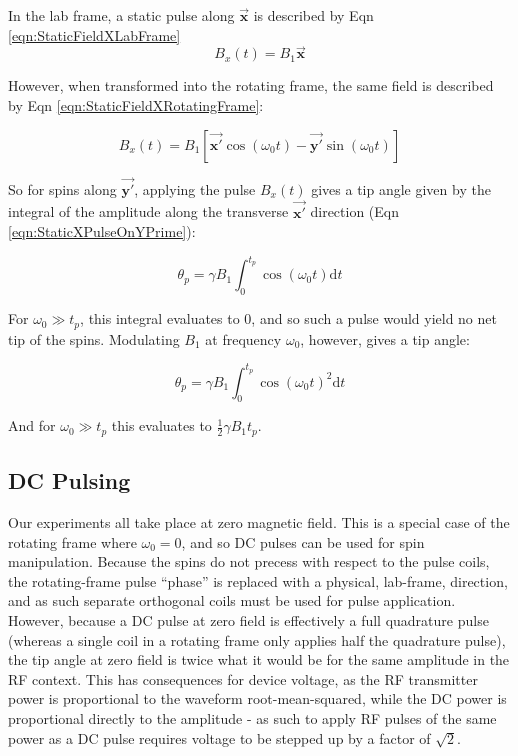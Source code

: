 \documentclass[PaulGanssle-Thesis.tex]{subfiles}
\begin{document}
In the lab frame, a static pulse along $\vec{\mathbf{x}}$ is described by Eqn \ref{eqn:StaticFieldXLabFrame}
\begin{equation}
\label{eqn:StaticFieldXLabFrame}
B_x(t) = B_{1}\vec{\mathbf{x}}
\end{equation}

However, when transformed into the rotating frame, the same field is described by Eqn \ref{eqn:StaticFieldXRotatingFrame}:

\begin{equation}
\label{eqn:StaticFieldXRotatingFrame}
B_x(t) = B_{1}\left[\vec{\mathbf{x'}}\cos\left(\omega_0 t\right) - \vec{\mathbf{y'}}\sin\left(\omega_0 t\right)\right]
\end{equation}

So for spins along $\vec{\mathbf{y'}}$, applying the pulse $B_x(t)$ gives a tip angle given by the integral of the amplitude along the transverse $\vec{\mathbf{x'}}$ direction (Eqn \ref{eqn:StaticXPulseOnYPrime}):

\begin{equation}
\label{eqn:StaticXPulseOnYPrime}
\theta_p = \gamma B_{1}\int_0^{t_p}\!\cos\left(\omega_0 t\right)\mathrm{d}t
\end{equation}

For $\omega_0 \gg t_p$, this integral evaluates to 0, and so such a pulse would yield no net tip of the spins. Modulating $B_1$ at frequency $\omega_0$, however, gives a tip angle:

\begin{equation}
\label{eqn:ResonantPulseXPrime}
\theta_p = \gamma B_{1} \int_0^{t_p}\!\cos\left(\omega_0 t\right)^2\mathrm{d}t
\end{equation}

And for $\omega_0 \gg t_p$ this evaluates to $\frac{1}{2}\gamma B_1 t_p$.

\subsection{DC Pulsing}
\label{nmr.pulsecoil.DC}
Our experiments all take place at zero magnetic field. This is a special case of the rotating frame where $\omega_0 = 0$, and so DC pulses can be used for spin manipulation. Because the spins do not precess with respect to the pulse coils, the rotating-frame pulse ``phase'' is replaced with a physical, lab-frame, direction, and as such separate orthogonal coils must be used for pulse application. However, because a DC pulse at zero field is effectively a full quadrature pulse (whereas a single coil in a rotating frame only applies half the quadrature pulse), the tip angle at zero field is twice what it would be for the same amplitude in the RF context. This has consequences for device voltage, as the RF transmitter power is proportional to the waveform root-mean-squared, while the DC power is proportional directly to the amplitude - as such to apply RF pulses of the same power as a DC pulse requires voltage to be stepped up by a factor of $\sqrt{2}$.
\end{document}
